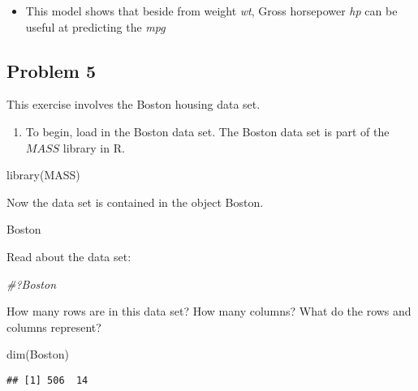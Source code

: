 \documentclass[
]{article}
\newenvironment{Shaded}{\begin{snugshade}}{\end{snugshade}}
\newcommand{\CommentTok}[1]{\textcolor[rgb]{0.56,0.35,0.01}{\textit{#1}}}
\newcommand{\FunctionTok}[1]{\textcolor[rgb]{0.00,0.00,0.00}{#1}}
\newcommand{\NormalTok}[1]{#1}
\providecommand{\tightlist}{%
  \setlength{\itemsep}{0pt}\setlength{\parskip}{0pt}}
\begin{document}
\begin{itemize}
\tightlist
\item
  This model shows that beside from weight \emph{wt}, Gross horsepower
  \emph{hp} can be useful at predicting the \emph{mpg}
\end{itemize}

\hypertarget{problem-5}{%
\subsection{Problem 5}\label{problem-5}}

This exercise involves the Boston housing data set.

\begin{enumerate}
\def\labelenumi{(\alph{enumi})}
\tightlist
\item
  To begin, load in the Boston data set. The Boston data set is part of
  the \(MASS\) library in R.
\end{enumerate}

\begin{Shaded}
\begin{Highlighting}[]
\FunctionTok{library}\NormalTok{(MASS)}
\end{Highlighting}
\end{Shaded}

Now the data set is contained in the object Boston.

\begin{Shaded}
\begin{Highlighting}[]
\NormalTok{Boston}
\end{Highlighting}
\end{Shaded}

Read about the data set:

\begin{Shaded}
\begin{Highlighting}[]
\CommentTok{\#?Boston}
\end{Highlighting}
\end{Shaded}

How many rows are in this data set? How many columns? What do the rows
and columns represent?

\begin{Shaded}
\begin{Highlighting}[]
\FunctionTok{dim}\NormalTok{(Boston)}
\end{Highlighting}
\end{Shaded}

\begin{verbatim}
## [1] 506  14
\end{verbatim}
\end{document}
